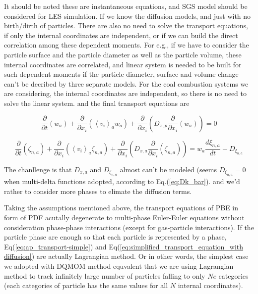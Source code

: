 It should be noted these are instantaneous equations, and SGS model
should be considered for LES simulation. If we know the diffusion
models, and just with no birth/dirth of particles. There are also
no need to solve the transport equations, if only the internal coordinates
are independent, or if we can build the direct correlation among these
dependent moments. For e.g., if we have to consider the particle surface
and the particle diameter as well as the particle volume, these internal
coordinates are correlated, and linear system is needed to be built
for such dependent moments if the particle diameter, surface and volume
change can't be decribed by three separate models. For the coal combustion
systems we are considering, the internal coordinates are independent,
so there is no need to solve the linear system. and the final transport
equations are

\begin{equation}
\frac{\partial}{\partial t}\left(w_{a}\right)+\frac{\partial}{\partial x_{i}}\left(\left<v_{i}\right>_{a}w_{a}\right)+\frac{\partial}{\partial x_{i}}\left(D_{x,p}\frac{\partial}{\partial x_{i}}\left(w_{a}\right)\right)=0\label{eq:ap_transport-simp_diffusion}
\end{equation}


\begin{equation}
\frac{\partial}{\partial t}\left(\zeta_{n,a}\right)+\frac{\partial}{\partial x_{i}}\left(\left<v_{i}\right>_{a}\zeta_{n,a}\right)+\frac{\partial}{\partial x_{i}}\left(D_{x,a}\frac{\partial}{\partial x_{i}}\left(\zeta_{n,a}\right)\right)=w_{a}\frac{d\xi_{n,a}}{dt}+D_{\xi_{n,a}}\label{eq:simplified_transport_equation_with diffusion}
\end{equation}


The chanllenge is that $D_{x,a}$ and $D_{\xi_{n,a}}$ almost can't
be modeled (seems $D_{\xi_{n,a}}=0$ when multi-delta functions adopted, according to Eq.(\ref{eq:Dk_bar}).
and we'd rather to consider more phases to elimate the diffusion terms. 



Taking the assumptions mentioned above, the transport equations of
PBE in form of PDF acutally degenerate to multi-phase Euler-Euler
equations without consideration phase-phase interactions (except for
gas-particle interactions). If the particle phase are enough so that
each particle is represented by a phase, Eq(\ref{eq:ap_transport-simple})
and Eq(\ref{eq:simplified_transport_equation_with diffusion}) are
actually Lagrangian method. Or in other words, the simplest case we
adopted with DQMOM method equvalent that we are using Lagrangian method
to track infinitely large number of particles falling to only $Ne$
categories (each categories of particle has the same values for all
$N$ internal coordinates). 




